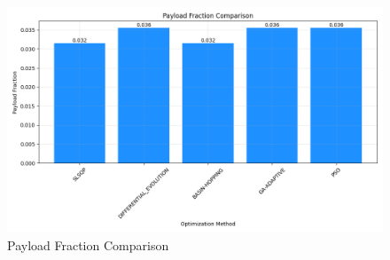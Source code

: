 \documentclass{article}
\begin{document}
\begin{figure}[H]
\centering
\includegraphics[width=\textwidth]{payload_fraction.png}
\caption{Payload Fraction Comparison}
\end{figure}
\end{document}
